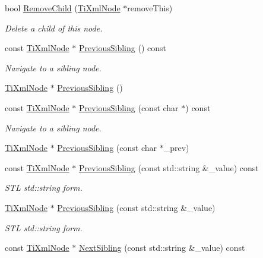 \begin{DoxyCompactItemize}
\item 
bool \hyperlink{class_ti_xml_node_ae19d8510efc90596552f4feeac9a8fbf}{Remove\-Child} (\hyperlink{class_ti_xml_node}{Ti\-Xml\-Node} $\ast$remove\-This)
\begin{DoxyCompactList}\small\item\em Delete a child of this node. \end{DoxyCompactList}\item 
const \hyperlink{class_ti_xml_node}{Ti\-Xml\-Node} $\ast$ \hyperlink{class_ti_xml_node_ac2cd892768726270e511b2ab32de4d10}{Previous\-Sibling} () const 
\begin{DoxyCompactList}\small\item\em Navigate to a sibling node. \end{DoxyCompactList}\item 
\hyperlink{class_ti_xml_node}{Ti\-Xml\-Node} $\ast$ \hyperlink{class_ti_xml_node_af8c0642ad6ecc03f62953e68896ed1cc}{Previous\-Sibling} ()
\item 
const \hyperlink{class_ti_xml_node}{Ti\-Xml\-Node} $\ast$ \hyperlink{class_ti_xml_node_abbb3b8c1f38fa7b9e52d584a4aeca795}{Previous\-Sibling} (const char $\ast$) const 
\begin{DoxyCompactList}\small\item\em Navigate to a sibling node. \end{DoxyCompactList}\item 
\hyperlink{class_ti_xml_node}{Ti\-Xml\-Node} $\ast$ \hyperlink{class_ti_xml_node_a6c977049207177ef21b51972315c2053}{Previous\-Sibling} (const char $\ast$\-\_\-prev)
\item 
const \hyperlink{class_ti_xml_node}{Ti\-Xml\-Node} $\ast$ \hyperlink{class_ti_xml_node_a658276f57d35d5d4256d1dc1a2c398ab}{Previous\-Sibling} (const std\-::string \&\-\_\-value) const 
\begin{DoxyCompactList}\small\item\em S\-T\-L std\-::string form. \end{DoxyCompactList}\item 
\hyperlink{class_ti_xml_node}{Ti\-Xml\-Node} $\ast$ \hyperlink{class_ti_xml_node_acc8a0434c7f401d4a3b6dee77c1a5912}{Previous\-Sibling} (const std\-::string \&\-\_\-value)
\begin{DoxyCompactList}\small\item\em S\-T\-L std\-::string form. \end{DoxyCompactList}\item 
const \hyperlink{class_ti_xml_node}{Ti\-Xml\-Node} $\ast$ \hyperlink{class_ti_xml_node_a1b94d2f7fa7ab25a5a8e8d4340c449c9}{Next\-Sibling} (const std\-::string \&\-\_\-value) const 

\end{DoxyCompactItemize}
